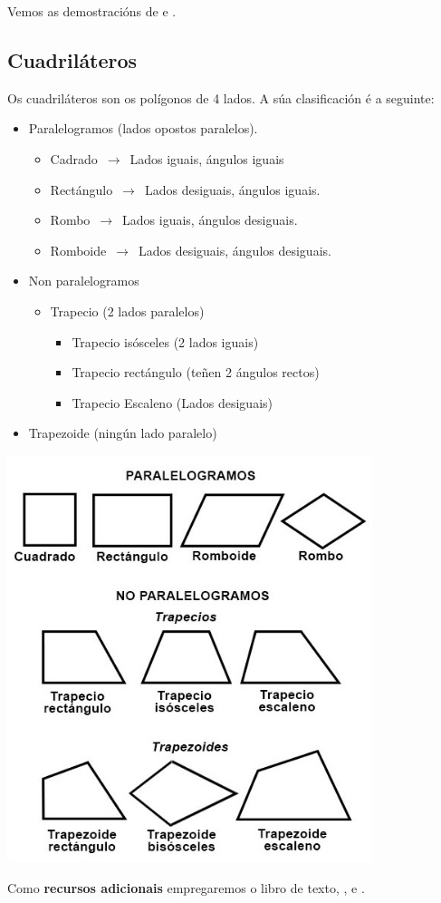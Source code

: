 Vemos as demostracións de \cite{yt:pitagoras} e \cite{universomat}.


\subsection{Cuadriláteros}

Os cuadriláteros son os polígonos de 4 lados. A súa clasificación é a seguinte:

\begin{itemize}
    \item Paralelogramos (lados opostos paralelos).
    \begin{itemize}
        \item Cadrado $\,\to\,$ Lados iguais, ángulos iguais
        \item Rectángulo $\,\to\,$ Lados desiguais, ángulos iguais.
        \item Rombo $\,\to\,$ Lados iguais, ángulos desiguais.
        \item Romboide $\,\to\,$ Lados desiguais, ángulos desiguais.
    \end{itemize}
    \item Non paralelogramos
    \begin{itemize}
        \item Trapecio (2 lados paralelos)
        \begin{itemize}
            \item Trapecio isósceles (2 lados iguais)
            \item Trapecio rectángulo (teñen 2 ángulos rectos)
            \item Trapecio Escaleno (Lados desiguais)
        \end{itemize}
    \end{itemize}
    \item Trapezoide (ningún lado paralelo)
\end{itemize}

\begin{center}
\includegraphics[width=0.8\textwidth]{img/clasificacin-cuadrilateros.jpg}
\end{center}

Como \textbf{recursos adicionais} empregaremos o libro de texto, \cite{wiki:cuadrilatero}, \cite{yt:cuad1} e \cite{yt:cuad2}.
